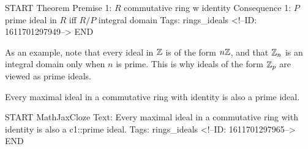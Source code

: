 \documentclass{memoir}
\begin{document}
\begin{anki}
START
Theorem
Premise 1: \(R\) commutative ring w identity
Consequence 1: \(P\) prime ideal in \(R\) iff \(R / P\) integral domain
Tags: rings_ideals
<!--ID: 1611701297949-->
END
\end{anki}

As an example, note that every ideal in \(\mathbb{Z}\) is of the form \(n\mathbb{Z}\), and that \(\mathbb{Z}_n\) is an integral domain only when \(n\) is prime. This is why ideals of the form \(\mathbb{Z}_p\) are viewed as prime ideals.
\begin{cor}
	Every maximal ideal in a commutative ring with identity is also a prime ideal.
\end{cor}

\begin{anki}
START
MathJaxCloze
Text: Every maximal ideal in a commutative ring with identity is also a {{c1::prime ideal}}. 
Tags: rings_ideals
<!--ID: 1611701297965-->
END
\end{anki}
\end{document}
